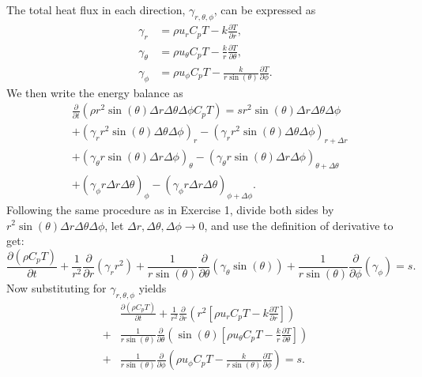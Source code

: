 \documentclass[12pt]{article}
\begin{document}
\begin{ex}
\begin{solution}
  The total heat flux in each direction, $\gamma_{r,\theta,\phi}$, can be expressed as
  \begin{align*}
    \gamma_r&=\rho u_rC_pT-k\frac{\partial T}{\partial r},\\
    \gamma_{\theta}&=\rho u_{\theta}C_pT-\frac{k}{r}\frac{\partial T}{\partial \theta},\\
    \gamma_{\phi}&=\rho u_{\phi}C_pT-\frac{k}{r\sin(\theta)}\frac{\partial T}{\partial \phi}.
  \end{align*}
  We then write the energy balance as
  \begin{align*}
    &\frac{\partial}{\partial t}(\rho r^2\sin(\theta)\Delta r\Delta\theta\Delta\phi C_p T)=sr^2\sin(\theta)\Delta r\Delta\theta\Delta\phi\\
    &+(\gamma_r r^2\sin(\theta)\Delta\theta\Delta\phi)_{r}-(\gamma_r r^2\sin(\theta)\Delta\theta\Delta\phi)_{r+\Delta r}\\
    &+(\gamma_{\theta} r\sin(\theta)\Delta r\Delta\phi)_{\theta}-(\gamma_{\theta} r\sin(\theta)\Delta r\Delta\phi)_{\theta+\Delta\theta}\\
    &+(\gamma_{\phi} r\Delta r\Delta\theta)_{\phi}-(\gamma_{\phi} r\Delta r\Delta\theta)_{\phi+\Delta\phi}.
  \end{align*}
  Following the same procedure as in Exercise 1, divide both sides by $r^2\sin(\theta)\Delta r\Delta\theta\Delta\phi$, let $\Delta r,\Delta\theta,\Delta\phi\to 0$, and use the definition of derivative to get:
  \begin{equation*}
    \frac{\partial(\rho C_p T)}{\partial t}+\frac{1}{r^2}\frac{\partial}{\partial r}(\gamma_r r^2)+\frac{1}{r\sin(\theta)}\frac{\partial}{\partial\theta}(\gamma_{\theta}\sin(\theta))+\frac{1}{r\sin(\theta)}\frac{\partial}{\partial\phi}(\gamma_{\phi})=s.
  \end{equation*}
  Now substituting for $\gamma_{r,\theta,\phi}$ yields
  \begin{align*}
    &\frac{\partial(\rho C_p T)}{\partial t}+\frac{1}{r^2}\frac{\partial}{\partial r}\left(r^2\left[\rho u_rC_pT-k\frac{\partial T}{\partial r}\right]\right)\\
    +&\frac{1}{r\sin(\theta)}\frac{\partial}{\partial\theta}\left(\sin(\theta)\left[\rho u_{\theta}C_pT-\frac{k}{r}\frac{\partial T}{\partial \theta}\right]\right)\\
    +&\frac{1}{r\sin(\theta)}\frac{\partial}{\partial\phi}\left(\rho u_{\phi}C_pT-\frac{k}{r\sin(\theta)}\frac{\partial T}{\partial \phi}\right)=s.

\end{align*}
\end{solution}
\end{ex}
\end{document}
